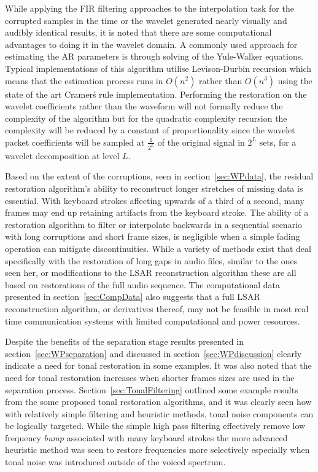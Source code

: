 While applying the FIR filtering approaches to the interpolation task for the corrupted samples in the time or the wavelet generated nearly visually and audibly identical results, it is noted that there are some computational advantages to doing it in the wavelet domain. A commonly used approach for estimating the AR parameters is through solving of the Yule-Walker equations. Typical implementations of this algorithm utilise Levison-Durbin recursion which means that the estimation process runs in $O(n^2)$\cite{Hayes1996} rather than $O(n^3)$ using the state of the art Cramer\'s rule implementation\cite{Habgood2012}. Performing the restoration on the wavelet coefficients rather than the waveform will not formally reduce the complexity of the algorithm but for the quadratic complexity recursion the complexity will be reduced by a constant of proportionality since the wavelet packet coefficients will be sampled at $\frac{1}{2^L}$ of the original signal in $2^L$ sets, for a wavelet decomposition at level $L$.

Based on the extent of the corruptions, seen in section~\ref{sec:WPdata}, the residual restoration algorithm's ability to reconstruct longer stretches of missing data is essential. With keyboard strokes affecting upwards of a third of a second, many frames may end up retaining artifacts from the keyboard stroke. The ability of a restoration algorithm to filter or interpolate backwards in a sequential scenario with long corruptions and short frame sizes, is negligible when a simple fading operation can mitigate discontinuities. While a variety of methods exist that deal specifically with the restoration of long gaps in audio files, similar to the ones seen her, or modifications to the LSAR reconstruction algorithm\cite{Kauppinen2002a}\cite{Esquef2006} these are all based on restorations of the full audio sequence. The computational data presented in section~\ref{sec:CompData} also suggests that a full LSAR reconstruction algorithm, or derivatives thereof, may not be feasible in most real time communication systems with limited computational and power resources.

Despite the benefits of the separation stage results presented in section~\ref{sec:WPseparation} and discussed in section~\ref{sec:WPdiscussion} clearly indicate a need for tonal restoration in some examples. It was also noted that the need for tonal restoration increases when shorter frames sizes are used in the separation process. Section~\ref{sec:TonalFiltering} outlined some example results from the some proposed tonal restoration algorithms, and it was clearly seen how with relatively simple filtering and heuristic methods, tonal noise components can be logically targeted. While the simple high pass filtering effectively remove low frequency \emph{bump} associated with many keyboard strokes the more advanced heuristic method was seen to restore frequencies more selectively especially when tonal noise was introduced outside of the voiced spectrum.

